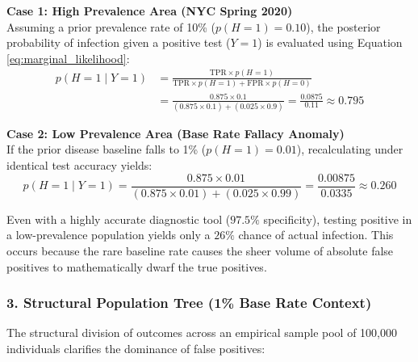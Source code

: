 \documentclass{article}
\begin{document}
\noindent \textbf{Case 1: High Prevalence Area (NYC Spring 2020)} \\
Assuming a prior prevalence rate of 10\% ($p(H=1) = 0.10$), the posterior probability of infection given a positive test ($Y=1$) is evaluated using Equation \ref{eq:marginal_likelihood}:
\begin{align}
    p(H=1 \mid Y=1) &= \frac{\text{TPR} \times p(H=1)}{\text{TPR} \times p(H=1) + \text{FPR} \times p(H=0)} \\
    &= \frac{0.875 \times 0.1}{(0.875 \times 0.1) + (0.025 \times 0.9)} = \frac{0.0875}{0.11} \approx \mathbf{0.795}
\end{align}

\noindent \textbf{Case 2: Low Prevalence Area (Base Rate Fallacy Anomaly)} \\
If the prior disease baseline falls to 1\% ($p(H=1) = 0.01$), recalculating under identical test accuracy yields:
\begin{equation}
    p(H=1 \mid Y=1) = \frac{0.875 \times 0.01}{(0.875 \times 0.01) + (0.025 \times 0.99)} = \frac{0.00875}{0.0335} \approx \mathbf{0.260}
\end{equation}

\begin{tcolorbox}[colback=red!5!white, colframe=red!75!black, title=The Intuitive Disconnect]
Even with a highly accurate diagnostic tool ($97.5\%$ specificity), testing positive in a low-prevalence population yields only a \textbf{$26\%$} chance of actual infection. This occurs because the rare baseline rate causes the sheer volume of absolute false positives to mathematically dwarf the true positives.
\end{tcolorbox}

\subsubsection*{3. Structural Population Tree (1\% Base Rate Context)}
The structural division of outcomes across an empirical sample pool of 100,000 individuals clarifies the dominance of false positives:
\end{document}
